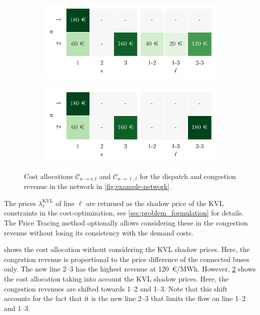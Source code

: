 \documentclass[11pt,twocolumn]{article}
\newcommand{\cost}{\mathcal{C}}
\newcommand{\allocategeneratorcost}[1][n \rightarrow s]{\cost_{#1, t}}
\newcommand{\allocatelinecost}[1][n \rightarrow \ell]{\cost_{#1, t}}
\begin{document}
\begin{figure}[h!]
    \begin{subfigure}[c]{\linewidth}
        \includegraphics[width=\linewidth]{example-with-cycles/payoff}
        \label{fig:example-network-payoff}
    \end{subfigure}
    \begin{subfigure}[c]{\linewidth}
        \includegraphics[width=\linewidth]{example-with-cycles/payoff-kvl}
        \label{fig:example-network-payoff-kvl}
    \end{subfigure}
    \caption{Cost allocations $\allocategeneratorcost$ and $\allocatelinecost$ for the dispatch and congestion revenue in the network in \cref{fig:example-network}.}
    \label{fig:example-network-payoff-all}
\end{figure}

The prices $\lambda_\ell^\text{KVL}$ of line $\ell$ are returned as the shadow price of the \ac{KVL} constraints in the cost-optimization, see \cref{sec:problem_formulation} for details. The Price Tracing method optionally allows considering these in the congestion revenue without losing its consistency with the demand costs. 



 shows the cost allocation without considering the \ac{KVL} shadow prices. Here, the congestion revenue is proportional to the price difference of the connected buses only. The new line 2--3 has the highest revenue at 120~\euro/MWh. However, \cref{fig:example-network-payoff-kvl} shows the cost allocation taking into account the \ac{KVL} shadow prices. Here, the congestion revenues are shifted towards 1--2 and 1--3. Note that this shift accounts for the fact that it is the new line 2--3 that limits the flow on line 1--2 and 1--3.    
\end{document}
